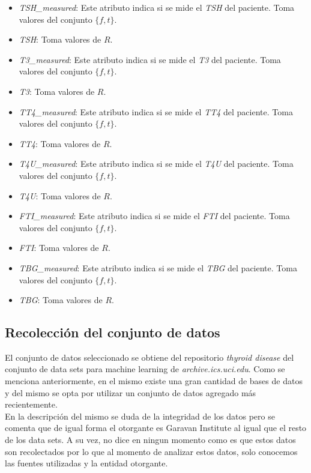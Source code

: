 \documentclass[osajnl,twocolumn,showpacs,superscriptaddress,10pt,floatfix]{revtex4-1} %
\begin{document}
\begin{itemize}
    \item \textit{TSH\_measured}: Este atributo indica si se mide el \textit{TSH} del paciente. Toma valores del conjunto $\{f, t\}$.
    \item \textit{TSH}: Toma valores de $R$.
    \item \textit{T3\_measured}: Este atributo indica si se mide el \textit{T3} del paciente. Toma valores del conjunto $\{f, t\}$.
    \item \textit{T3}: Toma valores de $R$.
    \item \textit{TT4\_measured}: Este atributo indica si se mide el \textit{TT4} del paciente. Toma valores del conjunto $\{f, t\}$.
    \item \textit{TT4}: Toma valores de $R$.
    \item \textit{T4U\_measured}: Este atributo indica si se mide el \textit{T4U} del paciente. Toma valores del conjunto $\{f, t\}$.
    \item \textit{T4U}: Toma valores de $R$.
    \item \textit{FTI\_measured}: Este atributo indica si se mide el \textit{FTI} del paciente. Toma valores del conjunto $\{f, t\}$.
    \item \textit{FTI}: Toma valores de $R$.
    \item \textit{TBG\_measured}: Este atributo indica si se mide el \textit{TBG} del paciente. Toma valores del conjunto $\{f, t\}$.
    \item \textit{TBG}: Toma valores de $R$.
\end{itemize}

\subsection{Recolección del conjunto de datos}

El conjunto de datos seleccionado se obtiene del repositorio \textit{thyroid disease} del conjunto de data sets para machine learning de \textit{archive.ics.uci.edu}. Como se menciona anteriormente, en el mismo existe una gran cantidad de bases de datos y del mismo se opta por utilizar un conjunto de datos agregado más recientemente. \\

En la descripción del mismo se duda de la integridad de los datos pero se comenta que de igual forma el otorgante es Garavan Institute al igual que el resto de los data sets. A su vez, no dice en ningun momento como es que estos datos son recolectados por lo que al momento de analizar estos datos, solo conocemos las fuentes utilizadas y la entidad otorgante. \\
\end{document}
